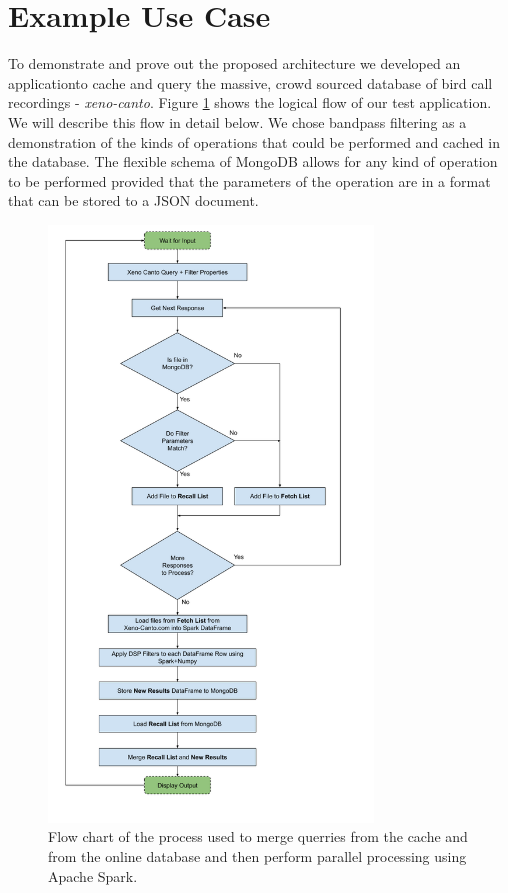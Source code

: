 \documentclass[conference,twoside]{IEEEtran}
\begin{document}
\section{Example Use Case}
To demonstrate and prove out the proposed architecture we developed an application\footnotemark to cache and query the massive, crowd sourced database of bird call recordings - \textit{xeno-canto}. Figure \ref{fig:flow} shows the logical flow of our test application. We will describe this flow in detail below. We chose bandpass filtering as a demonstration of the kinds of operations that could be performed and cached in the database. The flexible schema of MongoDB allows for any kind of operation to be performed provided that the parameters of the operation are in a format that can be stored to a JSON document.
\begin{figure}
  \centering
  \includegraphics[width=3.4in]{project_flow_chart}
  \caption{Flow chart of the process used to merge querries from the cache and from the online database and then perform parallel processing using Apache Spark.}
  \label{fig:flow}
\end{figure}
\end{document}
